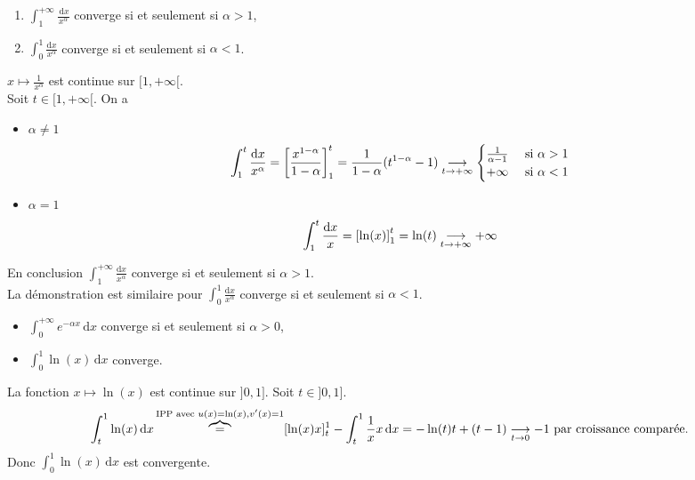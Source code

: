 \documentclass{book}
\begin{document}
\begin{Proposition}
  \begin{enumerate}
  \item
    $\int_1^{+\infty } \frac{\,\mathrm dx}{x^\alpha}$ converge si et seulement si $\alpha>1$,
  \item
    $\int_0^1    \frac{\mathrm dx}{x^\alpha}$ converge si et seulement si $\alpha<1$.
  \end{enumerate}
\end{Proposition}
\begin{Demonstration}
$x\mapsto  \frac{1}{x^\alpha}$ est continue sur  $[1,+\infty[$.\\
Soit $t\in [1,+\infty[$. On a 
\begin{itemize}
\item $\alpha\neq 1$
$$\int_1^{t } \frac{\mathrm dx}{x^\alpha}= \left[\frac{x^{1-\alpha}}{1-\alpha}\right]_1^t=\frac{1}{1-\alpha}(t^{1-\alpha}-1) \tend[t\to +\infty ]\begin{cases}\frac{1}{\alpha-1} &\text{ si } \alpha>1\\ +\infty &\text{ si } \alpha<1 \end{cases}$$
\item $\alpha= 1$
$$\int_1^{t } \frac{\mathrm dx}{x}= \left[\ln(x)\right]_1^t=\ln(t)\tend[t\to +\infty ]+\infty $$
\end{itemize}
En conclusion $\int_1^{+\infty } \frac{\mathrm dx}{x^\alpha}$ converge si et seulement si $\alpha>1$.\\
La démonstration est similaire pour $\int_0^1    \frac{\mathrm dx}{x^\alpha}$ converge si et seulement si $\alpha<1$.
\end{Demonstration}
\begin{Proposition}
  \begin{itemize}
  \item
    $\int_0^{+\infty } e^{-\alpha x} \,\mathrm dx$ converge si et seulement si $\alpha>0$,
  \item
    $\int_0^1   \ln(x) \,\mathrm dx $ converge.
  \end{itemize}
\end{Proposition}
\begin{Demonstration}
La fonction $ x\mapsto \ln(x) $ est continue sur $]0,1]$. Soit $t\in ]0,1]$.\\
$$\int_t^1   \ln(x) \,\mathrm dx \overbrace{=}^{\text{IPP avec }u(x)=\ln(x), v'(x)=1}[\ln(x)x]_t^1- \int_t^1   \frac 1 x x \,\mathrm dx= -\ln(t)t+(t-1)\tend[t\to 0 ] -1\text{ par croissance comparée}.$$
Donc $\int_0^1   \ln(x) \,\mathrm dx$ est convergente. 
\end{Demonstration}
\end{document}
